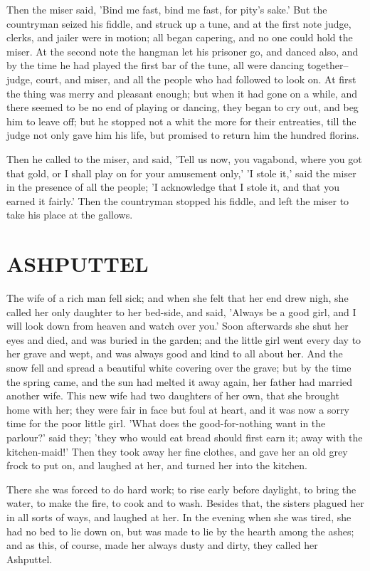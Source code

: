 \documentclass[12pt]{book}
\begin{document}
Then the miser said, 'Bind me fast, bind me fast, for pity's sake.'
But the countryman seized his fiddle, and struck up a tune, and at the
first note judge, clerks, and jailer were in motion; all began
capering, and no one could hold the miser. At the second note the
hangman let his prisoner go, and danced also, and by the time he had
played the first bar of the tune, all were dancing together--judge,
court, and miser, and all the people who had followed to look on. At
first the thing was merry and pleasant enough; but when it had gone on
a while, and there seemed to be no end of playing or dancing, they
began to cry out, and beg him to leave off; but he stopped not a whit
the more for their entreaties, till the judge not only gave him his
life, but promised to return him the hundred florins.

Then he called to the miser, and said, 'Tell us now, you vagabond,
where you got that gold, or I shall play on for your amusement only,'
'I stole it,' said the miser in the presence of all the people; 'I
acknowledge that I stole it, and that you earned it fairly.' Then the
countryman stopped his fiddle, and left the miser to take his place at
the gallows.



\chapter{ASHPUTTEL}

The wife of a rich man fell sick; and when she felt that her end drew
nigh, she called her only daughter to her bed-side, and said, 'Always
be a good girl, and I will look down from heaven and watch over you.'
Soon afterwards she shut her eyes and died, and was buried in the
garden; and the little girl went every day to her grave and wept, and
was always good and kind to all about her. And the snow fell and
spread a beautiful white covering over the grave; but by the time the
spring came, and the sun had melted it away again, her father had
married another wife. This new wife had two daughters of her own, that
she brought home with her; they were fair in face but foul at heart,
and it was now a sorry time for the poor little girl. 'What does the
good-for-nothing want in the parlour?' said they; 'they who would eat
bread should first earn it; away with the kitchen-maid!' Then they
took away her fine clothes, and gave her an old grey frock to put on,
and laughed at her, and turned her into the kitchen.

There she was forced to do hard work; to rise early before daylight,
to bring the water, to make the fire, to cook and to wash. Besides
that, the sisters plagued her in all sorts of ways, and laughed at
her. In the evening when she was tired, she had no bed to lie down on,
but was made to lie by the hearth among the ashes; and as this, of
course, made her always dusty and dirty, they called her Ashputtel.
\end{document}
